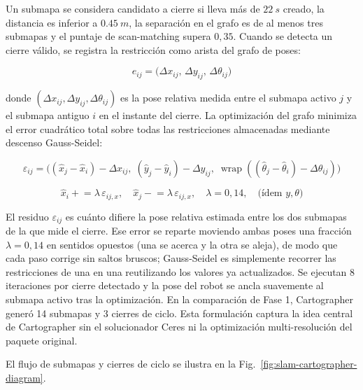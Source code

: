 Un submapa se considera candidato a cierre si lleva más de \(\SI{22}{s}\)
creado, la distancia es inferior a \(\SI{0.45}{m}\), la separación en el
grafo es de al menos tres submapas y el puntaje de scan-matching supera
\(0{,}35\). Cuando se detecta un cierre válido, se registra la
restricción como arista del grafo de poses:

\[
e_{ij} = \bigl(\Delta x_{ij},\,\Delta y_{ij},\,\Delta\theta_{ij}\bigr)
\]

donde $(\Delta x_{ij},\Delta y_{ij},\Delta\theta_{ij})$ es la pose relativa
medida entre el submapa activo $j$ y el submapa antiguo $i$ en el instante del
cierre. La optimización del grafo minimiza el error cuadrático total sobre
todas las restricciones almacenadas mediante descenso Gauss-Seidel:

\[
\varepsilon_{ij}=\bigl((\hat x_j-\hat x_i)-\Delta x_{ij},\;
(\hat y_j-\hat y_i)-\Delta y_{ij},\;
\operatorname{wrap}((\hat\theta_j-\hat\theta_i)-\Delta\theta_{ij})\bigr)
\]

\[
\hat x_i \mathrel{+}=\lambda\,\varepsilon_{ij,x},\quad
\hat x_j \mathrel{-}=\lambda\,\varepsilon_{ij,x},\quad \lambda=0{,}14,\quad\text{(ídem }y,\theta\text{)}
\]

El residuo \(\varepsilon_{ij}\) es cuánto difiere la pose relativa estimada entre
los dos submapas de la que mide el cierre. Ese error se reparte moviendo ambas
poses una fracción \(\lambda=0{,}14\) en sentidos opuestos (una se acerca y la
otra se aleja), de modo que cada paso corrige sin saltos bruscos; Gauss-Seidel es
simplemente recorrer las restricciones de una en una reutilizando los valores ya
actualizados. Se ejecutan 8 iteraciones por cierre detectado y la pose del robot
se ancla suavemente al submapa activo tras la optimización.
En la comparación de Fase 1, Cartographer generó 14 submapas y 3 cierres de ciclo.
Esta formulación captura la idea central de Cartographer \cite{hess2016} sin
el solucionador Ceres ni la optimización multi-resolución del paquete original.

El flujo de submapas y cierres de ciclo se ilustra en la Fig.~\ref{fig:slam-cartographer-diagram}.


